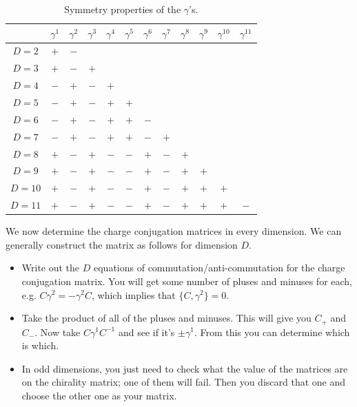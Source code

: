 \documentclass[11pt]{article}
\begin{document}
\begin{table}[H]
    \centering
    \begin{tabular}{|c|c|c|c|c|c|c|c|c|c|c|c|}
        \hline
         & $\gamma^1$ & $\gamma^2$ & $\gamma^3$ & $\gamma^4$ & $\gamma^5$ & $\gamma^6$ & $\gamma^7$ & $\gamma^8$ & $\gamma^9$ & $\gamma^{10}$ & $\gamma^{11}$ \\
        \hline
        $D = 2$  &  $+$  &  $-$  &     &     &     &     &     &     &     &     & \\ 
        $D = 3$  &  $+$  &  $-$  &  $+$  &     &     &     &     &     &     &     & \\
        $D = 4$  &  $-$  &  $+$  &  $-$  &  $+$  &     &     &     &     &     &     & \\
        $D = 5$  &  $-$  &  $+$  &  $-$  &  $+$  &  $+$  &     &     &     &     &     & \\
        $D = 6$  &  $-$  &  $+$  &  $-$  &  $+$  &  $+$  &  $-$  &     &     &     &     & \\
        $D = 7$  &  $-$  &  $+$  &  $-$  &  $+$  &  $+$  &  $-$  &  $+$  &     &     &     & \\
        $D = 8$  &  $+$  &  $-$  &  $+$  &  $-$  &  $-$  &  $+$  &  $-$  &  $+$  &     &     & \\
        $D = 9$  &  $+$  &  $-$  &  $+$  &  $-$  &  $-$  &  $+$  &  $-$  &  $+$  &  $+$  &     & \\
        $D = 10$ &  $+$  &  $-$  &  $+$  &  $-$  &  $-$  &  $+$  &  $-$  &  $+$  &  $+$  &  $+$  & \\
        $D = 11$ &  $+$  &  $-$  &  $+$  &  $-$  &  $-$  &  $+$  &  $-$  &  $+$  &  $+$  &  $+$  &  $-$  \\
        \hline
    \end{tabular}
    \caption{Symmetry properties of the $\gamma$'s.}
\end{table}

We now determine the charge conjugation matrices in every dimension.
We can generally construct the matrix as follows for dimension $D$.
\begin{itemize}
    \item Write out the $D$ equations of commutation/anti-commutation
    for the charge conjugation matrix. You will get some number of pluses
    and minuses for each, e.g. $C \gamma^2 = - \gamma^2 C$, which implies
    that $\{ C, \gamma^2 \} = 0$.
    \item Take the product of all of the pluses and minuses. This will give you
    $C_+$ and $C_-$. Now take $C \gamma^1 C^{-1}$ and see if it's $\pm \gamma^1$.
    From this you can determine which is which.
    \item In odd dimensions, you just need to check what the value of the matrices
    are on the chirality matrix; one of them will fail. Then you discard that one
    and choose the other one as your matrix.
\end{itemize}
\end{document}
